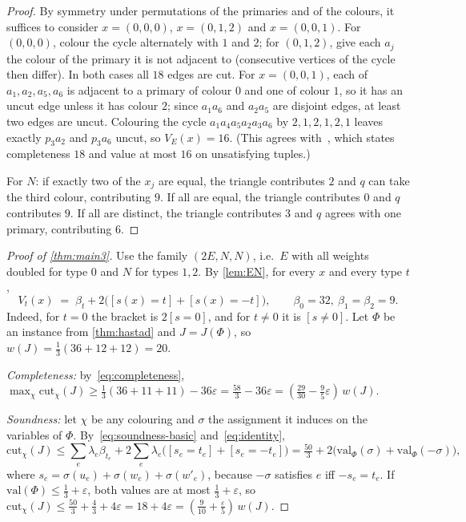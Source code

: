 \documentclass[11pt,letterpaper]{article}
\theoremstyle{remark}
\newcommand{\eps}{\varepsilon}
\newcommand{\cut}{\mathrm{cut}}
\newcommand{\val}{\mathrm{val}}
\begin{document}
\begin{proof}
By symmetry under permutations of the primaries and of the colours, it suffices to consider
$x=(0,0,0)$, $x=(0,1,2)$ and $x=(0,0,1)$. For $(0,0,0)$, colour the cycle alternately with $1$ and $2$; for
$(0,1,2)$, give each $a_j$ the colour of the primary it is not adjacent to (consecutive vertices of the
cycle then differ). In both cases all $18$ edges are cut. For $x=(0,0,1)$, each of $a_1,a_2,a_5,a_6$ is
adjacent to a primary of colour $0$ and one of colour $1$, so it has an uncut edge unless it has colour
$2$; since $a_1a_6$ and $a_2a_5$ are disjoint edges, at least two edges are uncut. Colouring the cycle
$a_1a_4a_5a_2a_3a_6$ by $2,1,2,1,2,1$ leaves exactly
$p_3a_2$ and $p_3a_6$ uncut, so $V_E(x)=16$. (This agrees with~\cite[Lemma~C.1]{NRT25}, which states
completeness $18$ and value at most $16$ on unsatisfying tuples.)

For $N$: if exactly two of the $x_j$ are equal, the triangle contributes $2$ and $q$ can take the third
colour, contributing $9$. If all are equal, the triangle contributes $0$ and $q$ contributes $9$. If all
are distinct, the triangle contributes $3$ and $q$ agrees with one primary, contributing $6$.
\end{proof}

\begin{proof}[Proof of \cref{thm:main3}]
Use the family $(2E, N, N)$, i.e.\ $E$ with all weights doubled for type $0$ and $N$ for types $1,2$.
By \cref{lem:EN}, for every $x$ and every type $t$,
\begin{equation}\label{eq:identity}
V_t(x) \;=\; \beta_t + 2\big([s(x)=t]+[s(x)=-t]\big),\qquad \beta_0 = 32,\ \beta_1=\beta_2=9.
\end{equation}
Indeed, for $t=0$ the bracket is $2[s=0]$, and for $t\neq 0$ it is $[s\neq 0]$.
Let $\Phi$ be an instance from \cref{thm:hastad} and $J=J(\Phi)$, so $w(J)=\frac13(36+12+12)=20$.

\emph{Completeness:} by~\eqref{eq:completeness}, $\max_\chi\cut_\chi(J)\ge \frac13(36+11+11)-36\eps
= \frac{58}{3}-36\eps = (\frac{29}{30}-\frac{9}{5}\eps)\,w(J)$.

\emph{Soundness:} let $\chi$ be any colouring and $\sigma$ the assignment it induces on the variables of
$\Phi$. By~\eqref{eq:soundness-basic} and~\eqref{eq:identity},
\[
  \cut_\chi(J) \le \sum_e \lambda_e\beta_{t_e} + 2\sum_e \lambda_e\big([s_e=t_e]+[s_e=-t_e]\big)
  = \tfrac{50}{3} + 2\big(\val_\Phi(\sigma)+\val_\Phi(-\sigma)\big),
\]
where $s_e=\sigma(u_e)+\sigma(w_e)+\sigma(w'_e)$, because $-\sigma$ satisfies $e$ iff $-s_e=t_e$. If
$\val(\Phi)\le\frac13+\eps$, both values are at most $\frac13+\eps$, so
$\cut_\chi(J)\le \frac{50}{3}+\frac43+4\eps = 18+4\eps = (\frac{9}{10}+\frac{\eps}{5})\,w(J)$.
\end{proof}
\end{document}
